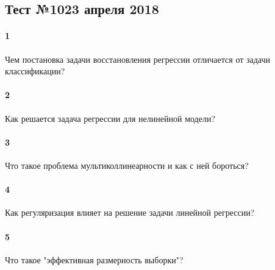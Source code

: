 \documentclass[a4paper,12pt]{article}
\begin{document}
  \subsection*{Тест №10\hfill{23 апреля 2018}}

  
  \paragraph{1} Чем постановка задачи восстановления регрессии отличается от задачи классификации?

  \makebox[\linewidth]{\hrulefill}
  \makebox[\linewidth]{\hrulefill}

  \paragraph{2} Как решается задача регрессии для нелинейной модели?
	
  \makebox[\linewidth]{\hrulefill}
  \makebox[\linewidth]{\hrulefill}
  \makebox[\linewidth]{\hrulefill}
	
  \paragraph{3} Что такое проблема мультиколлинеарности и как с ней бороться?

  \makebox[\linewidth]{\hrulefill}
  \makebox[\linewidth]{\hrulefill}

  \paragraph{4} Как регуляризация влияет на решение задачи линейной регрессии?

  \makebox[\linewidth]{\hrulefill}
  \makebox[\linewidth]{\hrulefill}
  \makebox[\linewidth]{\hrulefill}
  \makebox[\linewidth]{\hrulefill}

  \paragraph{5} Что такое "эффективная размерность выборки"?

  \makebox[\linewidth]{\hrulefill}
  \makebox[\linewidth]{\hrulefill}
  \makebox[\linewidth]{\hrulefill}
  \makebox[\linewidth]{\hrulefill}
  \makebox[\linewidth]{\hrulefill}
 
\end{document}
